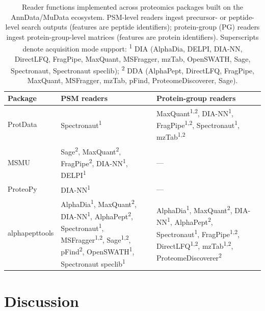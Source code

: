 \documentclass[pdflatex,sn-nature]{sn-jnl}%
\theoremstyle{thmstyleone}%
\theoremstyle{thmstyletwo}%
\theoremstyle{thmstylethree}%
\begin{document}
\begin{table}[ht]
\centering
\caption{Reader functions implemented across proteomics packages built on the AnnData/MuData ecosystem. PSM-level readers ingest precursor- or peptide-level search outputs (features are peptide identifiers); protein-group (PG) readers ingest protein-group-level matrices (features are protein identifiers). Superscripts denote acquisition mode support: \textsuperscript{1} DIA (AlphaDia, DELPI, DIA-NN, DirectLFQ, FragPipe, MaxQuant, MSFragger, mzTab, OpenSWATH, Sage, Spectronaut, Spectronaut speclib); \textsuperscript{2} DDA (AlphaPept, DirectLFQ, FragPipe, MaxQuant, MSFragger, mzTab, pFind, ProteomeDiscoverer, Sage).}\label{tab:readers}
\begin{tabularx}{\textwidth}{l X X}
\toprule
Package & PSM readers & Protein-group readers \\
\midrule
ProtData\cite{Frank.2025} & Spectronaut\textsuperscript{1} & MaxQuant\textsuperscript{1,2}, DIA-NN\textsuperscript{1}, FragPipe\textsuperscript{1,2}, Spectronaut\textsuperscript{1}, mzTab\textsuperscript{1,2} \\
\midrule
MSMU\cite{Choi.2026} & Sage\textsuperscript{2}, MaxQuant\textsuperscript{2}, FragPipe\textsuperscript{2}, DIA-NN\textsuperscript{1}, DELPI\textsuperscript{1} & --- \\
\midrule
ProteoPy\cite{Fichtner.2026} & DIA-NN\textsuperscript{1} & --- \\
\midrule
alphapepttools & AlphaDia\textsuperscript{1}, MaxQuant\textsuperscript{2}, DIA-NN\textsuperscript{1}, AlphaPept\textsuperscript{2}, Spectronaut\textsuperscript{1}, MSFragger\textsuperscript{1,2}, Sage\textsuperscript{1,2}, pFind\textsuperscript{2}, OpenSWATH\textsuperscript{1}, Spectronaut speclib\textsuperscript{1} & AlphaDia\textsuperscript{1}, MaxQuant\textsuperscript{2}, DIA-NN\textsuperscript{1}, AlphaPept\textsuperscript{2}, Spectronaut\textsuperscript{1}, FragPipe\textsuperscript{1,2}, DirectLFQ\textsuperscript{1,2}, mzTab\textsuperscript{1,2}, ProteomeDiscoverer\textsuperscript{2} \\
\bottomrule
\end{tabularx}
\end{table}

\section{Discussion}\label{sec:discussion}

\backmatter
\end{document}
